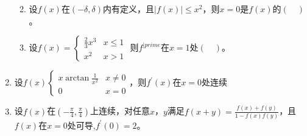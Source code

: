 \begin{enumerate}
\begin{enumerate}[(1)]
            \item 设$f(x)$在$(-\delta,\delta)$内有定义，且$\left|f(x)\right|\leq x^2$，则$x=0$是$f(x)$的$(\quad)$。
            \item 设$f(x)=\begin{cases}\frac{2}{3}x^3 & x\leq 1\\
                                        x^2 & x>1
                                    \end{cases}$
                                    则$f^{|prime}$在$x=1$处$(\quad)$。
        \end{enumerate}
    \item 设$f(x)\begin{cases}x\arctan \frac{1}{x^2} & x\neq 0\\
                                0 & x =0
                            \end{cases}$，则$f^{\prime}(x)$在$x=0$处连续
    \item 设$f(x)$在$(-\frac{\pi}{4},\frac{\pi}{4})$上连续，对任意$x$，$y$满足$f(x+y)=\frac{f(x)+f(y)}{1-f(x)f(y)}$，且$f(x)$在$x=0$处可导,$f^{\prime}(0)=2$。

\end{enumerate}

